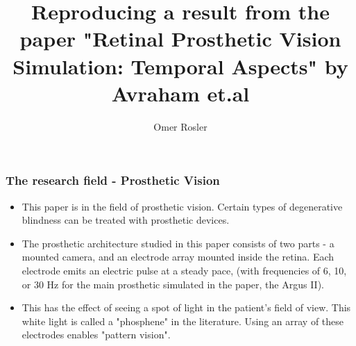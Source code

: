 \documentclass[]{beamer}
\title{Reproducing a result from the paper "Retinal Prosthetic Vision Simulation:
	Temporal Aspects" by Avraham et.al}
\author{Omer Rosler}
\theoremstyle{remark}
\begin{document}
\frame{\titlepage}

\begin{frame}
\frametitle{The research field - Prosthetic Vision}

\begin{itemize}
	\item This paper \cite{main_paper} is in the field of prosthetic vision. Certain types of degenerative blindness can be treated with prosthetic devices. 
	\item
	
	The prosthetic architecture studied in this paper consists of two parts -  a mounted camera, and an electrode array mounted inside the retina. Each electrode emits an electric pulse at a steady pace, (with frequencies of 6, 10, or 30 Hz for the main prosthetic simulated in the paper, the Argus II). 
	
	\item
	This has the effect of seeing a spot of light in the patient's field of view. This white light is called a "phosphene" in the literature. Using an array of these electrodes enables "pattern vision".
	
\end{itemize}

\end{frame}
\end{document}
